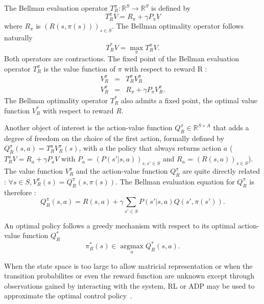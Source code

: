 \documentclass[smallextended]{svjour3}
\newcommand{\argmax}{\operatorname*{argmax}} %
\begin{document}
The Bellman evaluation operator $T^\pi_R: \mathbb{R}^{S} \rightarrow  \mathbb{R}^{S}$ is defined by
\begin{equation}
  T^{\pi}_RV = R_\pi + \gamma P_\pi V
  \end{equation}
where $R_\pi$ is $(R(s,\pi(s)))_{s\in S}$. The Bellman optimality operator follows naturally
\begin{equation}
  T^*_RV = \max_\pi T^\pi_RV.
\end{equation}
  Both operators are contractions. The fixed point of the Bellman evaluation operator $T^\pi_R$ is the value function of $\pi$ with respect to reward R :
  \begin{eqnarray}
    V^\pi_R &=& T^\pi_R V^\pi_R\\
    V^\pi_R &=& R_\pi + \gamma P_\pi V^\pi_R.
  \end{eqnarray}
The Bellman optimality operator $T^*_R$ also admits a fixed point, the optimal value function $V_R^*$ with respect to reward $R$.

Another object of interest is the action-value function $Q^\pi_R\in\mathbb{R}^{S\times A}$ that adds a degree of freedom on the choice of the first action, formally defined by $Q^\pi_R(s,a) = T^a_RV^\pi_R(s)$, with $a$ the policy that always returns action $a$ ($T^a_RV = R_a + \gamma P_a V$ with $P_a = (P(s'|s,a))_{s,s' \in S}$ and $R_a$ = $(R(s,a))_{s\in S}$). The value function $V^\pi_R$ and the action-value function $Q^\pi_R$ are quite directly related : $\forall s \in S, V^\pi_R(s) = Q^\pi_R(s,\pi(s))$. The Bellman evaluation equation for $Q^\pi_R$ is therefore :
\begin{equation}
  Q^\pi_R(s,a) = R(s,a) + \gamma \sum_{s'\in S}P(s'|s,a) Q(s',\pi(s')).
  \label{eq:bellman1}
\end{equation}

An optimal policy follows a greedy mechanism with respect to its optimal action-value function $Q^*_R$
\begin{equation}
  \label{eq:greedy}
  \pi^*_R(s)\in\argmax_aQ^*_R(s,a).
\end{equation}

When the state space is too large to allow matricial representation or when the transition probabilites or even the reward function are unknown except through observations gained by interacting with the system, RL or ADP may be used to approximate the optimal control policy~\cite{sutton1998reinforcement}.
\end{document}
